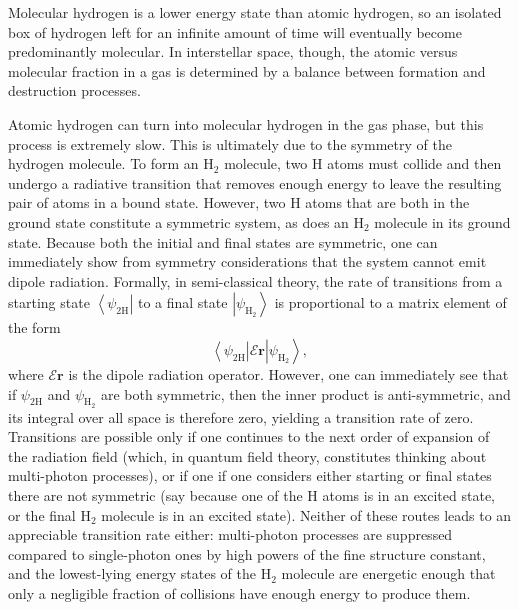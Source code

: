 Molecular hydrogen is a lower energy state than atomic hydrogen, so an isolated box of hydrogen left for an infinite amount of time will eventually become predominantly molecular. In interstellar space, though, the atomic versus molecular fraction in a gas is determined by a balance between formation and destruction processes.

Atomic hydrogen can turn into molecular hydrogen in the gas phase, but this process is extremely slow. This is ultimately due to the symmetry of the hydrogen molecule. To form an H$_2$ molecule, two H atoms must collide and then undergo a radiative transition that removes enough energy to leave the resulting pair of atoms in a bound state. However, two H atoms that are both in the ground state constitute a symmetric system, as does an H$_2$ molecule in its ground state. Because both the initial and final states are symmetric, one can immediately show from symmetry considerations that the system cannot emit dipole radiation. Formally, in semi-classical theory, the rate of transitions from a starting state $\left\langle\psi_{2\mathrm{H}}\right|$ to a final state $\left|\psi_{\mathrm{H}_2}\right\rangle$ is proportional to a matrix element of the form
\begin{equation}
\left\langle\psi_{2\mathrm{H}}\right| \mathcal{E} \mathbf{r} \left|\psi_{\mathrm{H}_2}\right\rangle,
\end{equation}
where $\mathcal{E} \mathbf{r}$ is the dipole radiation operator. However, one can immediately see that if $\psi_{2\mathrm{H}}$ and $\psi_{\mathrm{H}_2}$ are both symmetric, then the inner product is anti-symmetric, and its integral over all space is therefore zero, yielding a transition rate of zero. Transitions are possible only if one continues to the next order of expansion of the radiation field (which, in quantum field theory, constitutes thinking about multi-photon processes), or if one if one considers either starting or final states there are not symmetric (say because one of the H atoms is in an excited state, or the final H$_2$ molecule is in an excited state). Neither of these routes leads to an appreciable transition rate either: multi-photon processes are suppressed compared to single-photon ones by high powers of the fine structure constant, and the lowest-lying energy states of the H$_2$ molecule are energetic enough that only a negligible fraction of collisions have enough energy to produce them.

